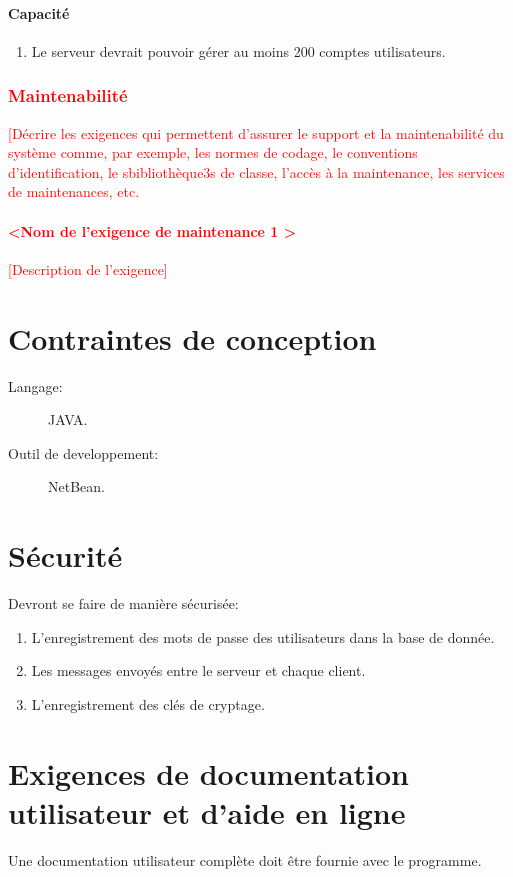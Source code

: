 \documentclass[10pt,a4paper]{report}
\begin{document}
\paragraph{Capacité}

 	\begin{enumerate}
 		\item Le serveur devrait pouvoir gérer au moins 200 comptes utilisateurs.
 	\end{enumerate}
\textcolor{red}{\subsubsection{Maintenabilité}
[Décrire les exigences qui permettent d’assurer le support et la maintenabilité du système comme, par exemple, les normes de codage, le conventions d’identification, le sbibliothèque3s de classe, l’accès à la maintenance, les services de maintenances, etc. 
\paragraph{\textless Nom de l’exigence de maintenance 1 \textgreater}
[Description de l’exigence]}


\section{Contraintes de conception}
\begin{description}
\item[Langage:] JAVA.
\item[Outil de developpement:] NetBean.
\end{description}


\section{Sécurité}
Devront se faire de manière sécurisée:
\begin{enumerate}
\item L'enregistrement des mots de passe des utilisateurs dans la base de donnée.
\item Les messages envoyés entre le serveur et chaque client.
\item L'enregistrement des clés de cryptage.
\end{enumerate}


\section{Exigences de documentation utilisateur et d’aide en ligne}
Une documentation utilisateur complète doit être fournie avec le programme.
\end{document}
